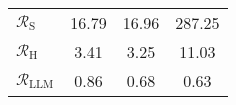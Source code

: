 \begin{table}[ht]
\begin{tabular}{lccc}
$\mathcal{R}_\text{S}$   & 16.79 & 16.96   & 287.25 \\
$\mathcal{R}_\text{H}$   & 3.41   & 3.25   & 11.03  \\
$\mathcal{R}_\text{LLM}$ & 0.86   & 0.68   & 0.63   \\
\bottomrule
\end{tabular}

\vspace{-2mm} %
\end{table}

